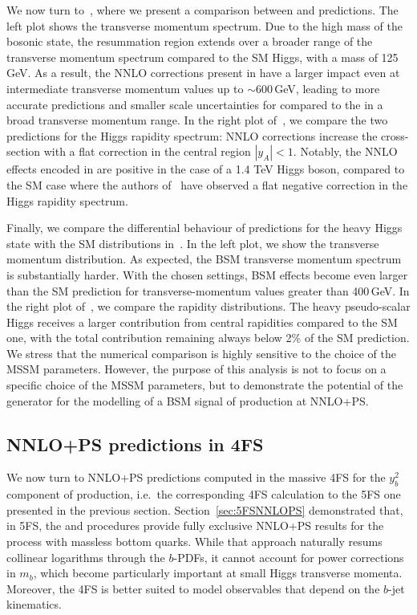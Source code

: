 \documentclass[11pt,a4paper]{article}
\begin{document}
We now turn to~, where we present a comparison between \minnlo{}  and \minlo{} predictions. 
The left plot shows the transverse momentum spectrum.
Due to the high mass of the bosonic state, the resummation region extends over a broader range of the transverse momentum spectrum compared to the SM Higgs, with a mass of 125\,GeV. As a result, the NNLO corrections present in \minnlo{} have a larger impact even at intermediate transverse momentum values up to $\sim 600$\,GeV, leading to more accurate predictions and smaller scale uncertainties for \minnlo{} compared to the \minlo{} in a broad transverse momentum range. 
In the right plot of~, we compare the two predictions for the Higgs rapidity spectrum: NNLO corrections increase the cross-section with a flat correction in the central region $|y_A|<1$. Notably, the NNLO effects encoded in \minnlo{} are positive in the case of a 1.4 TeV Higgs boson, compared to the SM case where the authors of~ have observed a flat negative correction in the Higgs rapidity spectrum.

Finally, we compare the differential behaviour of \minnlo{} predictions for the heavy Higgs state with the SM distributions in~. In the left plot, we show the transverse momentum distribution. 
As expected, the BSM transverse momentum spectrum is substantially harder. With the chosen settings, BSM effects become even larger than the SM prediction for transverse-momentum values greater than 400\,GeV. 
In the right plot of~, we compare the rapidity distributions. The heavy pseudo-scalar Higgs receives a larger contribution from central rapidities compared to the SM one, with the total contribution remaining always below 2\% of the SM prediction. We stress that the numerical comparison is highly sensitive to the choice of the MSSM parameters. However, the purpose of this analysis is not to focus on a specific choice of the MSSM parameters, but to demonstrate the potential of the \minnlo{} generator 
for the modelling of a BSM signal of \bbH{} production at NNLO+PS.



\subsection{NNLO+PS predictions in 4FS}\label{sec:bbH4FS}

We now turn to NNLO+PS predictions computed in the massive 4FS for the $y_{b}^{2}$ component of \bbH{} production, i.e.\ the 
corresponding 4FS calculation to the 5FS one presented in the previous section.
Section~\ref{sec:5FSNNLOPS} demonstrated that, in 5FS, the \minnlo{} and \GENEVA{} procedures provide fully exclusive 
NNLO+PS results for the \bbH{} process with massless bottom quarks. While that approach naturally resums collinear logarithms 
through the $b$-PDFs, it cannot account for power corrections in $m_{b}$, which become particularly important at 
small Higgs transverse momenta. Moreover, the 4FS is better suited to model observables that depend on the $b$-jet kinematics.
\end{document}
